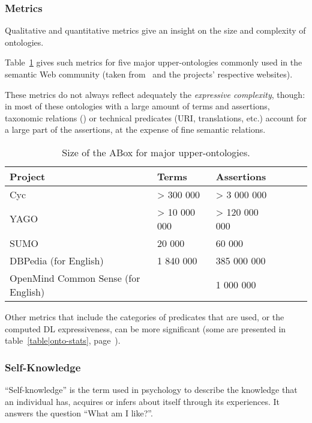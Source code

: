 \subsubsection{Metrics}

Qualitative and quantitative metrics give an insight on the size and
complexity of ontologies.

Table~\ref{table|upper_onto_metrics} gives such metrics for five major
upper-ontologies commonly used in the semantic Web community (taken
from~\cite{Mascardi2007} and the projects' respective websites).

These metrics do not always reflect adequately the \emph{expressive
complexity}, though: in most of these ontologies with a large amount of terms
and assertions, taxonomic relations () or technical predicates
(URI, translations, etc.) account for a large part of the assertions, at the
expense of fine semantic relations.

\begin{table}
\begin{center}

\begin{tabular}{llllll}
\toprule
{\bf Project} & {\bf Terms} & {\bf Assertions} \\
\midrule
Cyc & > 300 000 & > 3 000 000 & \\
YAGO & > 10 000 000 & > 120 000 000 \\
SUMO & 20 000 & 60 000 \\
DBPedia (for English) & 1 840 000 & 385 000 000\\
OpenMind Common Sense (for English) & & 1 000 000\\
\bottomrule

\end{tabular}
\end{center}
\caption{Size of the ABox for major upper-ontologies.}
\label{table|upper_onto_metrics}
\end{table}

Other metrics that include the categories of predicates that are used, or the
computed DL expressiveness, can be more significant (some are presented in
table~\ref{table|onto-stats}, page~\pageref{table|onto-stats}).

\subsubsection{Self-Knowledge}

``Self-knowledge'' is the term used in psychology to describe the knowledge
that an individual has, acquires or infers about itself through its
experiences. It answers the question ``What am I like?''.

